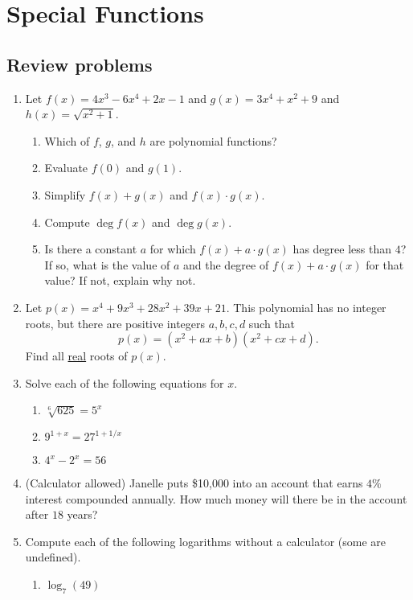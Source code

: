 \section{Special Functions}

\subsection{Review problems}

\begin{enumerate}
\item Let $f(x) = 4x^3 - 6x^4 + 2x - 1$ and $g(x) = 3x^4 + x^2 + 9$ and $h(x) = \sqrt{x^2 + 1}$.
\begin{enumerate}
\item Which of $f$, $g$, and $h$ are polynomial functions?
\item Evaluate $f(0)$ and $g(1)$.
\item Simplify $f(x) + g(x)$ and $f(x)\cdot g(x)$.
\item Compute $\deg f(x)$ and $\deg g(x)$.
\item Is there a constant $a$ for which $f(x) + a\cdot g(x)$ has degree less than $4$? If so, what is the value of $a$ and the degree of $f(x) + a\cdot g(x)$ for that value? If not, explain why not.
\end{enumerate}
\item Let $p(x) = x^4 + 9x^3 + 28x^2 + 39x + 21$. This polynomial has no integer roots, but there are positive integers $a,b,c,d$ such that 
\begin{equation*}
p(x) = (x^2 + ax + b)(x^2 + cx + d).
\end{equation*}
Find all \underline{real} roots of $p(x)$.
\item Solve each of the following equations for $x$.
\begin{enumerate}
\item $\sqrt[6]{625} = 5^x$
\item $9^{1 + x} = 27^{1 + 1/x}$
\item $4^x - 2^x = 56$
\end{enumerate}
\item (Calculator allowed) Janelle puts \$10,000 into an account that earns $4\%$ interest compounded annually. How much money will there be in the account after $18$ years?
\item Compute each of the following logarithms without a calculator (some are undefined).
\begin{enumerate}
\item $\log_7(49)$

\end{enumerate}
\end{enumerate}
